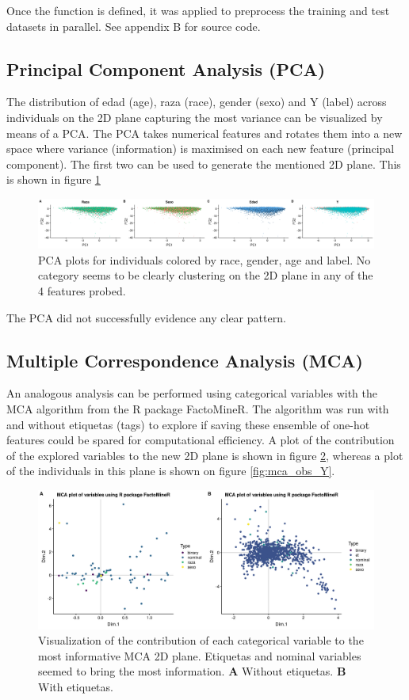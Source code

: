 \documentclass{article}\usepackage[]{graphicx}\usepackage[]{color}
\begin{document}
Once the function is defined, it was applied to preprocess the training and test datasets in parallel. See appendix B for source code.

  
\subsection{\textbf{P}rincipal \textbf{C}omponent \textbf{A}nalysis (PCA)}

The distribution of edad (age), raza (race), gender (sexo) and Y (label) across individuals on the 2D plane capturing the most variance can be visualized by means of a PCA. The PCA takes numerical features and rotates them into a new space where variance (information) is maximised on each new feature (principal component). The first two can be used to generate the mentioned 2D plane. This is shown in figure \ref{fig:pca_multicategory}

\begin{figure}[!h]
\centering
\includegraphics[width=.7\textwidth]{plots/PCA_multicategory}
\caption{PCA plots for individuals colored by race, gender, age and label. No category seems to be clearly clustering on the 2D plane in any of the 4 features probed.}
\label{fig:pca_multicategory}
\end{figure}

The PCA did not successfully evidence any clear pattern.

\subsection{\textbf{M}ultiple \textbf{C}orrespondence \textbf{A}nalysis (MCA)}

An analogous analysis can be performed using categorical variables with the MCA algorithm from the R package FactoMineR. The algorithm was run with and without etiquetas (tags) to explore if saving these ensemble of one-hot features could be spared for computational efficiency. A plot of the contribution of the explored variables to the new 2D plane is shown in figure \ref{fig:mca_variables}, whereas a plot of the individuals in this plane is shown on figure \ref{fig:mca_obs_Y}.

\begin{figure}[!h]
\centering
\includegraphics[width=.7\textwidth]{plots/mca_variables_combined}
\caption{Visualization of the contribution of each categorical variable to the most informative MCA 2D plane. Etiquetas and nominal variables seemed to bring the most information. \textbf{A} Without etiquetas. \textbf{B} With etiquetas.}
\label{fig:mca_variables}
\end{figure}
\end{document}
